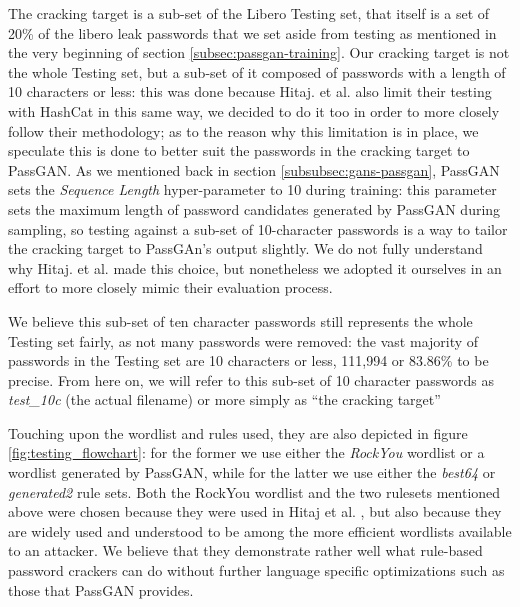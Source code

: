 The cracking target is a sub-set of the Libero Testing set, that itself is a set of 20\% of the libero leak passwords that we set aside from testing as mentioned in the very beginning of section \ref{subsec:passgan-training}.
Our cracking target is not the whole Testing set, but a sub-set of it composed of passwords with a length of 10 characters or less: this was done because Hitaj. et al. \cite{PassGAN} also limit their testing with HashCat in this same way, we decided to do it too in order to more closely follow their methodology; as to the reason why this limitation is in place, we speculate this is done to better suit the passwords in the cracking target to PassGAN. As we mentioned back in section \ref{subsubsec:gans-passgan}, PassGAN sets the \emph{Sequence Length} hyper-parameter to 10 during training: this parameter sets the maximum length of password candidates generated by PassGAN during sampling, so testing against a sub-set of 10-character passwords is a way to tailor the cracking target to PassGAn's output slightly.
We do not fully understand why Hitaj. et al. made this choice, but nonetheless we adopted it ourselves in an effort to more closely mimic their evaluation process.

We believe this sub-set of ten character passwords still represents the whole Testing set fairly, as not many passwords were removed: the vast majority of passwords in the Testing set are 10 characters or less, 111,994 or 83.86\% to be precise. 
From here on, we will refer to this sub-set of 10 character passwords as \emph{test\_10c} (the actual filename) or more simply as \enquote{the cracking target}


Touching upon the wordlist and rules used, they are also depicted in figure \ref{fig:testing_flowchart}: for the former we use either the \emph{RockYou} wordlist or a wordlist generated by PassGAN, while for the latter we use either the \emph{best64} or \emph{generated2} rule sets. Both the RockYou wordlist and the two rulesets mentioned above were chosen because they were used in Hitaj et al. \cite{PassGAN}, but also because they are widely used and understood to be among the more efficient wordlists available to an attacker. We believe that they demonstrate rather well what rule-based password crackers can do without further language specific optimizations such as those that PassGAN provides. %

